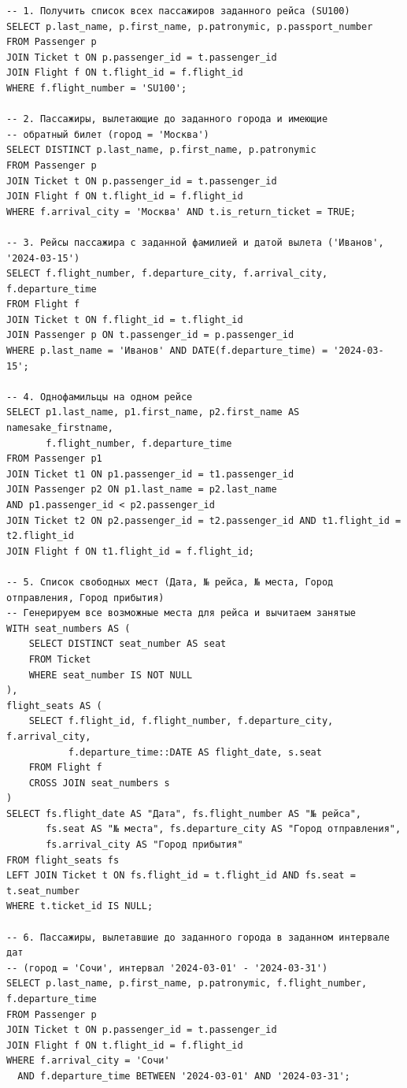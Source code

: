 \documentclass[a4paper,12pt]{article}
\begin{document}
\begin{verbatim}
-- 1. Получить список всех пассажиров заданного рейса (SU100)
SELECT p.last_name, p.first_name, p.patronymic, p.passport_number
FROM Passenger p
JOIN Ticket t ON p.passenger_id = t.passenger_id
JOIN Flight f ON t.flight_id = f.flight_id
WHERE f.flight_number = 'SU100';

-- 2. Пассажиры, вылетающие до заданного города и имеющие 
-- обратный билет (город = 'Москва')
SELECT DISTINCT p.last_name, p.first_name, p.patronymic
FROM Passenger p
JOIN Ticket t ON p.passenger_id = t.passenger_id
JOIN Flight f ON t.flight_id = f.flight_id
WHERE f.arrival_city = 'Москва' AND t.is_return_ticket = TRUE;

-- 3. Рейсы пассажира с заданной фамилией и датой вылета ('Иванов', '2024-03-15')
SELECT f.flight_number, f.departure_city, f.arrival_city, f.departure_time
FROM Flight f
JOIN Ticket t ON f.flight_id = t.flight_id
JOIN Passenger p ON t.passenger_id = p.passenger_id
WHERE p.last_name = 'Иванов' AND DATE(f.departure_time) = '2024-03-15';

-- 4. Однофамильцы на одном рейсе
SELECT p1.last_name, p1.first_name, p2.first_name AS namesake_firstname, 
       f.flight_number, f.departure_time
FROM Passenger p1
JOIN Ticket t1 ON p1.passenger_id = t1.passenger_id
JOIN Passenger p2 ON p1.last_name = p2.last_name 
AND p1.passenger_id < p2.passenger_id
JOIN Ticket t2 ON p2.passenger_id = t2.passenger_id AND t1.flight_id = t2.flight_id
JOIN Flight f ON t1.flight_id = f.flight_id;

-- 5. Список свободных мест (Дата, № рейса, № места, Город отправления, Город прибытия)
-- Генерируем все возможные места для рейса и вычитаем занятые
WITH seat_numbers AS (
    SELECT DISTINCT seat_number AS seat
    FROM Ticket
    WHERE seat_number IS NOT NULL
),
flight_seats AS (
    SELECT f.flight_id, f.flight_number, f.departure_city, f.arrival_city, 
           f.departure_time::DATE AS flight_date, s.seat
    FROM Flight f
    CROSS JOIN seat_numbers s
)
SELECT fs.flight_date AS "Дата", fs.flight_number AS "№ рейса", 
       fs.seat AS "№ места", fs.departure_city AS "Город отправления", 
       fs.arrival_city AS "Город прибытия"
FROM flight_seats fs
LEFT JOIN Ticket t ON fs.flight_id = t.flight_id AND fs.seat = t.seat_number
WHERE t.ticket_id IS NULL;

-- 6. Пассажиры, вылетавшие до заданного города в заданном интервале дат
-- (город = 'Сочи', интервал '2024-03-01' - '2024-03-31')
SELECT p.last_name, p.first_name, p.patronymic, f.flight_number, f.departure_time
FROM Passenger p
JOIN Ticket t ON p.passenger_id = t.passenger_id
JOIN Flight f ON t.flight_id = f.flight_id
WHERE f.arrival_city = 'Сочи' 
  AND f.departure_time BETWEEN '2024-03-01' AND '2024-03-31';


\end{verbatim}
\end{document}
